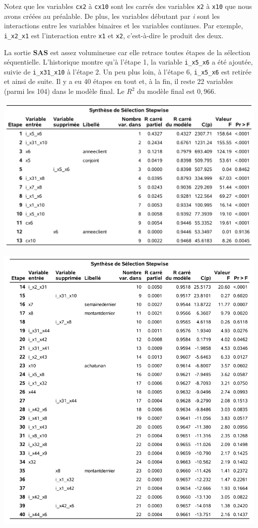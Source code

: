 \documentclass[
  11pt,
  letterpaper,
]{book}
\theoremstyle{definition}
\theoremstyle{definition}
\theoremstyle{definition}
\theoremstyle{remark}
\begin{document}
Notez que les variables \texttt{cx2} à \texttt{cx10} sont les carrés des variables \texttt{x2} à \texttt{x10} que nous avons créées au préalable. De plus, les variables débutant par \emph{i} sont les interactions entre les variables binaires et les variables continues. Par exemple, \texttt{i\_x2\_x1} est l'interaction entre \texttt{x1} et \texttt{x2}, c'est-à-dire le produit des deux.

La sortie \textbf{SAS} est assez volumineuse car elle retrace toutes étapes de la sélection séquentielle. L'historique montre qu'à l'étape 1, la variable \texttt{i\_x5\_x6} a été ajoutée, suivie de \texttt{i\_x31\_x10} à l'étape 2. Un peu plus loin, à l'étape 6, \texttt{i\_x5\_x6} est retirée et ainsi de suite. Il y a eu 40 étapes en tout et, à la fin, il reste 22 variables (parmi les 104) dans le modèle final. Le \(R^2\) du modèle final est \(0,966\).

\begin{center}\includegraphics[width=0.9\linewidth]{figures/02-select-e8} \end{center}

\begin{center}\includegraphics[width=0.9\linewidth]{figures/02-select-e9} \end{center}
\end{document}
